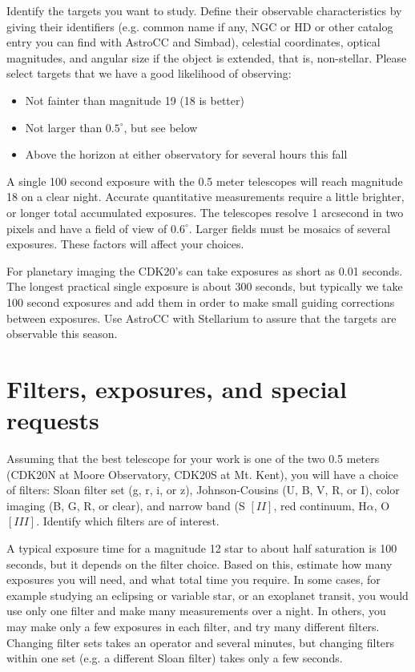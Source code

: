 \documentclass[dvips,12pt]{article}
\begin{document}
Identify the targets you want to study.  Define their observable characteristics
by giving their identifiers (e.g. common name if any, NGC or HD or other catalog
entry you can find with AstroCC and Simbad), celestial coordinates, optical
magnitudes, and angular size if the object is extended, that is, non-stellar.
Please select targets that we have a good likelihood of observing:
\begin{itemize}
\item Not fainter than magnitude 19 (18 is better)
\item Not larger than $0.5^\circ$, but see below
\item Above the horizon at either observatory for several hours this fall
\end{itemize}

A single 100 second exposure with the 0.5 meter telescopes will reach magnitude
18 on a clear night.  Accurate quantitative measurements require a little
brighter, or longer total accumulated exposures.  The telescopes resolve 1
arcsecond in two pixels and have a field of view of $0.6^\circ$.  Larger fields
must be mosaics of several exposures. These factors will affect your
choices.  

For planetary imaging the CDK20's can take exposures as short as 0.01 seconds. 
The longest practical single exposure is about 300 seconds, but typically we
take 100 second exposures and add them in order to make small guiding
corrections between exposures. Use AstroCC with Stellarium to assure that the
targets are observable this season.

\section{Filters, exposures, and special requests}

Assuming that the best telescope for your work is one of the two 0.5 meters
(CDK20N at Moore Observatory, CDK20S at Mt. Kent), you will have a choice of
filters:  Sloan filter set (g, r, i, or z),  Johnson-Cousins (U, B, V, R, or I),
color imaging (B, G, R, or clear), and narrow band (S $[II]$, red continuum,
H$\alpha$,  O$[III]$.  Identify which filters are of interest.

A typical exposure time for a magnitude 12 star to about half saturation is 100
seconds, but it depends on the filter choice.  Based on this, estimate how many
exposures you will need, and what total time you require.  In some cases, for
example studying an eclipsing or variable star, or an exoplanet transit, you
would use only one filter and make many measurements over a night.  In others,
you may make only a few exposures in each filter, and try many different
filters.   Changing filter sets takes an operator and several minutes, but
changing filters within one set (e.g. a different Sloan filter) takes only a few
seconds.
\end{document}
